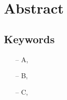 
\chapter*{Abstract}
\label{chapter:abstract}

\lipsum[1]


\section*{Keywords}
\label{section:keywords}

\begin{itemize}
    \item[–] A,
    \item[–] B,
    \item[–] C,
\end{itemize}
